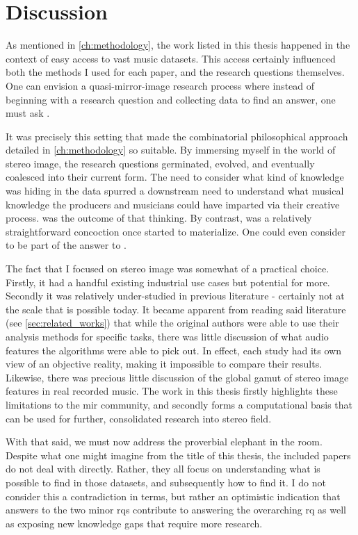 \chapter{Discussion}
\label{ch:discussion}

As mentioned in \cref{ch:methodology}, the work listed in this thesis happened in the context of easy access to vast music datasets. This access certainly influenced both the methods I used for each paper, and the research questions themselves. One can envision a quasi-mirror-image research process where instead of beginning with a research question and collecting data to find an answer, one must ask \mbox{\textit{}}. 

It was precisely this setting that made the combinatorial philosophical approach detailed in \cref{ch:methodology} so suitable. By immersing myself in the world of stereo image, the research questions germinated, evolved, and eventually coalesced into their current form. The need to consider what kind of knowledge was hiding in the data spurred a downstream need to understand what musical knowledge the producers and musicians could have imparted via their creative process. \rqa{} was the outcome of that thinking. By contrast, \rqb{} was a relatively straightforward concoction once \rqa{} started to materialize. One could even consider \rqb{} to be part of the answer to \rqa{}.

The fact that I focused on stereo image was somewhat of a practical choice. Firstly, it had a handful existing industrial use cases but potential for more. Secondly it was relatively under-studied in previous literature - certainly not at the scale that is possible today. It became apparent from reading said literature (see \cref{sec:related_works}) that while the original authors were able to use their analysis methods for specific tasks, there was little discussion of what audio features the algorithms were able to pick out. In effect, each study had its own view of an objective reality, making it impossible to compare their results. Likewise, there was precious little discussion of the global gamut of stereo image features in real recorded music. The work in this thesis firstly highlights these limitations to the \gls{mir} community, and secondly forms a computational basis that can be used for further, consolidated research into stereo field.

With that said, we must now address the proverbial elephant in the room. Despite what one might imagine from the title of this thesis, the included papers do not deal with  directly. Rather, they all focus on understanding what is possible to find in those datasets, and subsequently how to find it. I do not consider this a contradiction in terms, but rather an optimistic indication that answers to the two minor \glspl{rq} contribute to answering the overarching \gls{rq} as well as exposing new knowledge gaps that require more research.

